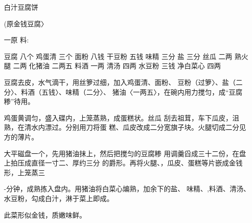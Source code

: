 \begin{recipe}{白汁豆腐饼}

(原金钱豆腐〉

一原 料:

豆腐	八个	鸡蛋清	三个
面粉	八钱	干豆粉	五钱
味精	三分	盐	三分
丝瓜	二两	熟火腿	二两
化猪油	二两五	料酒	一两
清汤	四两	水豆粉	三钱
净白菜心	四两

\cooking

\step 	豆腐去皮，水气滴干，用丝箩过细，加入鸡蛋清、面粉、 豆粉（过箩〉、盐（二分〉、料酒（五钱〉、味精（二分〉、 猪油〈一两五〉，在碗内用力搅匀，成“豆腐糁”待用。

\step 	鸡蛋黄调匀，盛入碟内，上笼蒸熟，成蛋糕状。丝瓜 刮去祖茸，车下瓜皮，沮熟，在清水内漂过。分别用刀将蛋 糕、瓜皮改成二分宽旗子块。火腿切成二分见方的薄片。

\step 	大平磁盘一个，先用猪油抹上，然后把搅匀的豆腐糁 用调羹舀成三十二份，在盘上拍压成直径一寸二、厚约三分 的爵形。再将火腿、，瓜皮、蛋糕等片嵌成金钱形，上笼蒸三

-分钟，成熟拣入盘内。用猪油将白菜心煸熟，加余下的盐、 味精、,料酒、清汤、水豆粉，勾成白汁，淋于菜上即成。

\notes

此菜形似金钱，质嫩味鲜。

\end{recipe}

